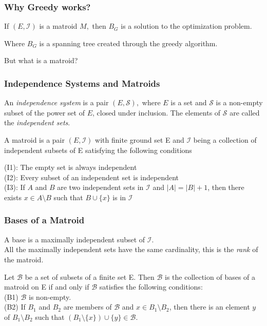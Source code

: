 \documentclass{beamer}
\begin{document}
\begin{frame}
\frametitle{Why Greedy works?}

\begin{lemma}
If $(E,\mathcal{I})$ is a matroid $M,$ then $B_G$ is a solution to the optimization problem.
\end{lemma}


Where $B_G$ is a spanning tree created through the greedy algorithm.


\vspace{5mm}

But what is a matroid?

\end{frame}


\begin{frame}
\frametitle{Independence Systems and Matroids}
\begin{definition}
An \textit{independence system} is a pair $(E,\mathcal{S}),$ where $E$ is a set and $\mathcal{S}$ is a non-empty subset of the power set of $E$, closed under inclusion. The elements of $\mathcal{S}$ are called the \textit{independent sets}.
\end{definition}
\begin{definition}
A matroid is a pair $(E,\mathcal{I})$ with finite ground set E and $\mathcal{I}$ being a collection of independent subsets of E satisfying the following conditions

\vspace{2mm}

 \noindent (I1): The empty set is always independent\\
 \noindent (I2): Every subset of an independent set is independent\\
 \noindent (I3): If $ A $ and $ B $ are two independent sets in $\mathcal{I}$ and $|A|=|B|+1$, then there exists $ x \in A \setminus B $ such that $ B \cup \{ x \} $ is in $\mathcal{I}$
\end{definition}

\end{frame}

\begin{frame}
\frametitle{Bases of a Matroid}
 
\begin{definition}
A base is a maximally independent subset of $\mathcal{I}.$\\
\noindent All the maximally independent sets have the same cardinality, this is the \textit{rank} of the matroid.
\end{definition}
\begin{definition}
  Let $\mathcal{B}$ be a set of subsets of a finite set E. Then $\mathcal{B}$ is the collection of bases of a matroid on E if and only if $\mathcal{B}$ satisfies the following conditions:\\
 (B1) $\mathcal{B}$ is non-empty.\\
 (B2) If $B_1$ and $B_2$ are members of $\mathcal{B}$ and $x \in B_1 \setminus B_2$, then there is an element $y$ of $B_1 \setminus B_2$ such that $(B_1 \setminus \{x\}) \cup \{y\} \in \mathcal{B}$.
 \end{definition}
\end{frame}
\end{document}
